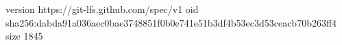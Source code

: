 version https://git-lfs.github.com/spec/v1
oid sha256:dabda91a036aec0bae3748851f0b0e741e51b3df4b53ec3d53ceacb70b263ff4
size 1845
